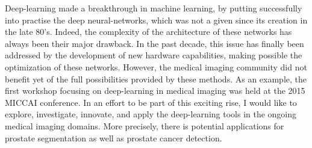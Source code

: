 \documentclass[a4paper]{article}
\begin{document}
Deep-learning made a breakthrough in machine learning, by putting successfully into practise the deep neural-networks, which was not a given since its creation in the late 80's. 
Indeed, the complexity of the architecture of these networks has always been their major drawback.
In the past decade, this issue has finally been addressed by the development of new hardware capabilities, making possible the optimization of these networks.
However, the medical imaging community did not benefit yet of the full possibilities provided by these methods.
As an example, the first workshop focusing on deep-learning in medical imaging was held at the 2015 MICCAI conference.
In an effort to be part of this exciting rise, I would like to explore, investigate, innovate, and apply the deep-learning tools in the ongoing medical imaging domains. More precisely, there is potential applications for prostate segmentation as well as prostate cancer detection.

\end{document}
